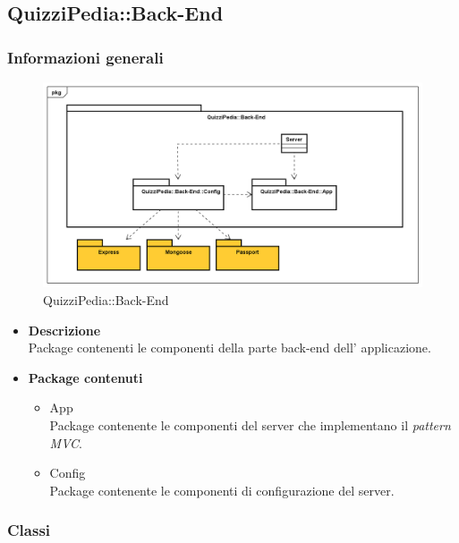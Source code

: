 \subsection{QuizziPedia::Back-End}
\subsubsection{Informazioni generali}
\label{QuizziPedia::Back-End}
\begin{figure}
	\centering
	\includegraphics[scale=0.45]{UML/Package/QuizziPedia_Back-End.png}
	\caption{QuizziPedia::Back-End}
\end{figure}

	\begin{itemize}
		\item \textbf{Descrizione} \\ Package contenenti le componenti della parte back-end dell' applicazione.
		\item \textbf{Package contenuti}
		\begin{itemize}
			\item App \\
			Package contenente le componenti del server che implementano il \textit{pattern MVC}.
			\item Config \\
			Package contenente le componenti di configurazione del server.
		\end{itemize}
	\end{itemize}
\subsubsection{Classi}
